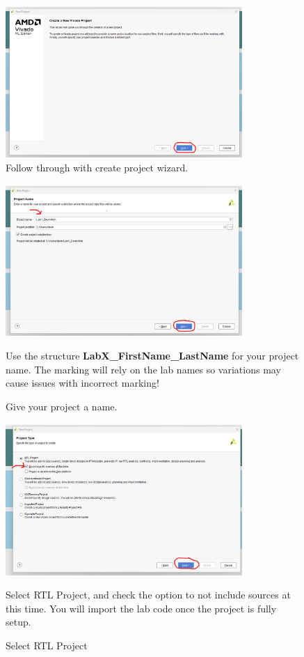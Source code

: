 \ifpdf
    \begin{figure}[H]
        \centering
        \includegraphics[width=9cm]{Images/CreateProjectImages/Vivado_CreateProject_Page1.png}
        \caption{Follow through with create project wizard.}
        \label{fig:enter-label}
    \end{figure}
    \begin{figure}[H]
        \centering
        \includegraphics[width=9cm]{Images/CreateProjectImages/Vivado_CreateProject_Page2.png}
        \caption{Give  your project a name.}
        \label{fig:enter-label}
        \raggedright
        \vspace{0.5cm}
        Use the structure 
        \textbf{LabX\_FirstName\_LastName}
        for your project name. The marking will rely on the lab names so variations may cause issues with incorrect marking! 
    \end{figure}


    \begin{figure}[H]
        \centering
        \includegraphics[width=9cm]{Images/CreateProjectImages/Vivado_CreateProject_Page3.png}
        \caption{Select RTL Project}
        \label{fig:enter-label}
        \raggedright
        Select RTL Project, and check the option to not include sources at this time. You will import the lab code once the project is fully setup.

    \end{figure}

